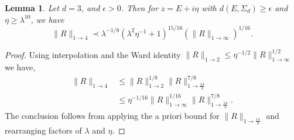 \documentclass[11pt]{amsart}
\newcommand{\ldom}{\prec}
\numberwithin{equation}{section}
\numberwithin{theorem}{section}
\newtheorem{lemma}[theorem]{Lemma}
\begin{document}
\begin{lemma}
\label{lem:five-plus-twelve}
Let $d=3$, and $\epsilon>0$. Then for $z= E+i\eta$ with $d(E,\Sigma_d)\geq \epsilon$ and $\eta\geq \lambda^{10}$, we have
\[
\|R\|_{1\to 4} \ldom \lambda^{-1/8} (\lambda^2 \eta^{-1}+1)^{15/16}
(\|R\|_{1\to \infty})^{1/16}.
\]
\end{lemma}
\begin{proof}
Using interpolation and the Ward identity $\|R\|_{1\to 2}\leq \eta^{-1/2} \|R\|_{1\to\infty}^{1/2}$ we have,
\begin{align*}
\|R\|_{1\to 4}
&\leq \|R\|_{1\to 2}^{1/8} \|R\|_{1\to \frac{14}{3}}^{7/8} \\
&\leq \eta^{-1/16} \|R\|_{1\to \infty}^{1/16} \|R\|_{1\to \frac{14}{3}}^{7/8}.
\end{align*}
The conclusion follows from applying the a priori bound for $\|R\|_{1\to \frac{14}{3}}$ and rearranging
factors of $\lambda$ and $\eta$.
\end{proof}
\end{document}
